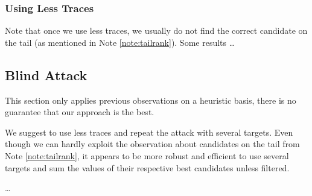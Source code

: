 \subsubsection{Using Less Traces}
	
	Note that once we use less traces, we usually do not find the correct candidate on the tail (as mentioned in Note \ref{note:tailrank}). Some results \ldots %



\subsection{Blind Attack}
\label{sec:subblindattack}

\begin{note}
	This section only applies previous observations on a heuristic basis, there is no guarantee that our approach is the best.
\end{note}

We suggest to use less traces and repeat the attack with several targets. Even though we can hardly exploit the observation about candidates on the tail from Note \ref{note:tailrank}, it appears to be more robust and efficient to use several targets and sum the values of their respective best candidates unless filtered.

\ldots




